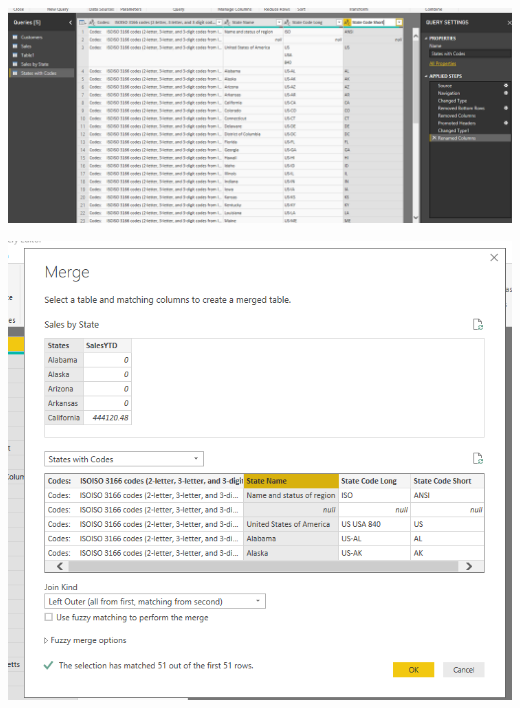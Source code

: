 	\begin{center}
	\includegraphics[width=15cm]{./Imagenes/EJER1T3(8)}
	\end{center}	
\newpage
	\begin{center}
	\includegraphics[width=15cm]{./Imagenes/EJER1T3(9)}
	\end{center}	


